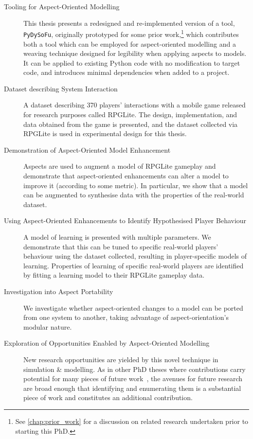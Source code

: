 \begin{description}
  \item[Tooling for Aspect-Oriented Modelling] This thesis presents a redesigned
    and re-implemented version of a tool, \lstinline{PyDySoFu}, originally
    prototyped for some prior work,\footnote{See \cref{chap:prior_work} for a
    discussion on related research undertaken prior to starting this PhD.} which contributes both a tool which can
    be employed for aspect-oriented modelling and a weaving technique designed
    for legibility when applying aspects to models. It can be applied to
    existing Python code with no modification to target code, and introduces
    minimal dependencies when added to a project.
  \item[Dataset describing \SocioTechnical System Interaction] A dataset
    describing 370 players' interactions with a mobile game released for
    research purposes called RPGLite. The design, implementation, and data
    obtained from the game is presented, and the dataset collected via RPGLite
    is used in experimental design for this thesis.
  \item[Demonstration of Aspect-Oriented Model Enhancement] Aspects are used to
    augment a model of RPGLite gameplay and demonstrate that aspect-oriented
    enhancements can alter a model to improve it (according to some metric). In
    particular, we show that a model can be augmented to synthesise data with
    the properties of the real-world dataset.
  \item[Using Aspect-Oriented Enhancements to Identify Hypothesised Player
    Behaviour] A model of learning is presented with multiple parameters. We
    demonstrate that this can be tuned to specific real-world players' behaviour
    using the dataset collected, resulting in player-specific models of
    learning. Properties of learning of specific real-world players are
    identified by fitting a learning model to their RPGLite gameplay data.
  \item[Investigation into Aspect Portability] We investigate whether
    aspect-oriented changes to a model can be ported from one system to another,
    taking advantage of aspect-orientation's modular nature.
  \item[Exploration of Opportunities Enabled by Aspect-Oriented Modelling]
    New research opportunities are yielded by this novel technique in simulation
    \& modelling. As in other PhD theses where contributions carry potential for
    many pieces of future work~\cite{marsh1994formalising}, the avenues for
    future research are broad enough that identifying and enumerating them is a
    substantial piece of work and constitutes an additional contribution.
\end{description}


